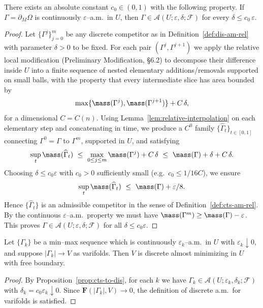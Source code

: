 \begin{proposition}\label{prop:cts-to-dis}
There exists an absolute constant $c_0\in(0,1)$ with the following property.
If $\Gamma=\partial_M\Omega$ is continuously $\varepsilon$–a.m.\ in $U$,
then $\Gamma\in\mathscr A(U;\varepsilon,\delta;\mathcal F)$ for every
$\delta\le c_0\,\varepsilon$.
\end{proposition}

\begin{proof}
Let $\{\Gamma^j\}_{j=0}^m$ be any discrete competitor as in Definition~\ref{def:dis-am-rel}
with parameter $\delta>0$ to be fixed.
For each pair $(\Gamma^j,\Gamma^{j+1})$ we apply the relative local modification
(Preliminary Modification, §6.2) to decompose their difference inside $U$ into a finite sequence of
nested elementary additions/removals supported on small balls, with the property that every
intermediate slice has area bounded by
\[
\max\{\mass(\Gamma^j),\mass(\Gamma^{j+1})\}+C\,\delta,
\]
for a dimensional $C=C(n)$.
Using Lemma~\ref{lem:relative-interpolation} on each elementary step and concatenating in time,
we produce a $C^0$ family $\{\widehat\Gamma_t\}_{t\in[0,1]}$ connecting $\Gamma^0=\Gamma$ to
$\Gamma^m$, supported in $U$, and satisfying
\[
\sup_t\mass(\widehat\Gamma_t)\ \le\ \max_{0\le j\le m}\mass(\Gamma^j)+C\,\delta
\ \le\ \mass(\Gamma)+\delta+C\,\delta.
\]
Choosing $\delta\le c_0\varepsilon$ with $c_0>0$ sufficiently small (e.g.\ $c_0\le 1/16C$),
we ensure
\[
\sup_t\mass(\widehat\Gamma_t)\ \le\ \mass(\Gamma)+\varepsilon/8.
\]
Hence $\{\widehat\Gamma_t\}$ is an admissible competitor in the sense of
Definition~\ref{def:cts-am-rel}. By the continuous $\varepsilon$–a.m.\ property we must have
\(\mass(\Gamma^m)\ge \mass(\Gamma)-\varepsilon\).
This proves $\Gamma\in \mathscr{A}(U;\varepsilon,\delta;\mathcal F)$ for all $\delta\le c_0\varepsilon$.
\end{proof}

\begin{corollary}\label{cor:dis-am-limit}
Let $\{\Gamma_k\}$ be a min–max sequence which is continuously $\varepsilon_k$–a.m.\ in $U$
with $\varepsilon_k\downarrow 0$, and suppose $|\Gamma_k|\to V$ as varifolds.
Then $V$ is discrete almost minimizing in $U$ with free boundary.
\end{corollary}

\begin{proof}
By Proposition~\ref{prop:cts-to-dis}, for each $k$ we have
$\Gamma_k\in \mathscr{A}(U;\varepsilon_k,\delta_k;\mathcal F)$ with
$\delta_k=c_0\varepsilon_k\downarrow 0$. Since $\mathbf F(|\Gamma_k|,V)\to 0$,
the definition of discrete a.m.\ for varifolds is satisfied.
\end{proof}

